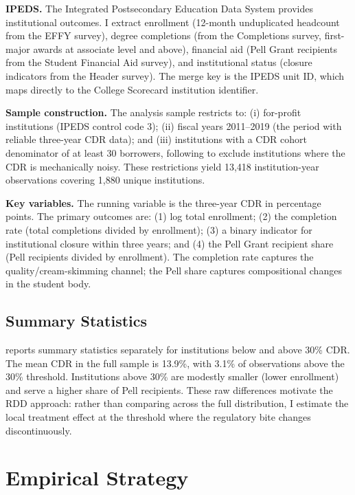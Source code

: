 \documentclass[12pt]{article}
\begin{document}
\textbf{IPEDS.} The Integrated Postsecondary Education Data System provides institutional outcomes. I extract enrollment (12-month unduplicated headcount from the EFFY survey), degree completions (from the Completions survey, first-major awards at associate level and above), financial aid (Pell Grant recipients from the Student Financial Aid survey), and institutional status (closure indicators from the Header survey). The merge key is the IPEDS unit ID, which maps directly to the College Scorecard institution identifier.

\textbf{Sample construction.} The analysis sample restricts to: (i) for-profit institutions (IPEDS control code 3); (ii) fiscal years 2011--2019 (the period with reliable three-year CDR data); and (iii) institutions with a CDR cohort denominator of at least 30 borrowers, following \citet{calonico2020} to exclude institutions where the CDR is mechanically noisy. These restrictions yield 13,418 institution-year observations covering 1,880 unique institutions.

\textbf{Key variables.} The running variable is the three-year CDR in percentage points. The primary outcomes are: (1) log total enrollment; (2) the completion rate (total completions divided by enrollment); (3) a binary indicator for institutional closure within three years; and (4) the Pell Grant recipient share (Pell recipients divided by enrollment). The completion rate captures the quality/cream-skimming channel; the Pell share captures compositional changes in the student body.

\subsection{Summary Statistics}



 reports summary statistics separately for institutions below and above 30\% CDR. The mean CDR in the full sample is 13.9\%, with 3.1\% of observations above the 30\% threshold. Institutions above 30\% are modestly smaller (lower enrollment) and serve a higher share of Pell recipients. These raw differences motivate the RDD approach: rather than comparing across the full distribution, I estimate the local treatment effect at the threshold where the regulatory bite changes discontinuously.


\section{Empirical Strategy}
\end{document}
